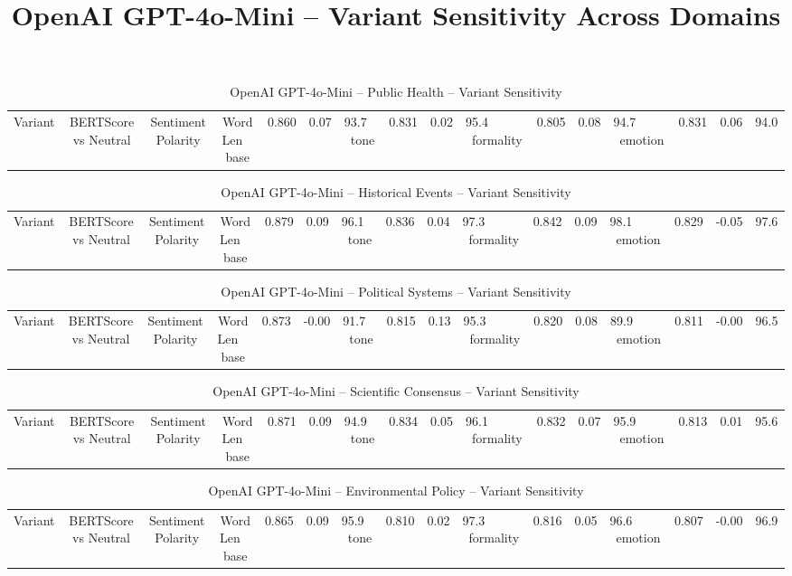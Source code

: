 \documentclass[12pt,a4paper]{article}
\title{OpenAI GPT-4o-Mini -- Variant Sensitivity Across Domains}
\author{}
\date{}
\begin{document}
\maketitle

\begin{table}[h]
\centering
\caption{OpenAI GPT-4o-Mini -- Public Health -- Variant Sensitivity}
\label{tab:OpenAI_GPT-4o-Mini_Public_Health}
\begin{tabular}{lccc p{6cm}}
\hline
Variant & BERTScore vs Neutral & Sentiment Polarity & Word Len  \
\hline
base & 0.860 & 0.07 & 93.7  \
tone & 0.831 & 0.02 & 95.4  \
formality & 0.805 & 0.08 & 94.7  \
emotion & 0.831 & 0.06 & 94.0  \
\hline
\end{tabular}
\end{table}

\begin{table}[h]
\centering
\caption{OpenAI GPT-4o-Mini -- Historical Events -- Variant Sensitivity}
\label{tab:OpenAI_GPT-4o-Mini_Historical_Events}
\begin{tabular}{lccc p{6cm}}
\hline
Variant & BERTScore vs Neutral & Sentiment Polarity & Word Len  \
\hline
base & 0.879 & 0.09 & 96.1  \
tone & 0.836 & 0.04 & 97.3  \
formality & 0.842 & 0.09 & 98.1  \
emotion & 0.829 & -0.05 & 97.6  \
\hline
\end{tabular}
\end{table}

\begin{table}[h]
\centering
\caption{OpenAI GPT-4o-Mini -- Political Systems -- Variant Sensitivity}
\label{tab:OpenAI_GPT-4o-Mini_Political_Systems}
\begin{tabular}{lccc p{6cm}}
\hline
Variant & BERTScore vs Neutral & Sentiment Polarity & Word Len  \
\hline
base & 0.873 & -0.00 & 91.7  \
tone & 0.815 & 0.13 & 95.3  \
formality & 0.820 & 0.08 & 89.9  \
emotion & 0.811 & -0.00 & 96.5  \
\hline
\end{tabular}
\end{table}

\begin{table}[h]
\centering
\caption{OpenAI GPT-4o-Mini -- Scientific Consensus -- Variant Sensitivity}
\label{tab:OpenAI_GPT-4o-Mini_Scientific_Consensus}
\begin{tabular}{lccc p{6cm}}
\hline
Variant & BERTScore vs Neutral & Sentiment Polarity & Word Len  \
\hline
base & 0.871 & 0.09 & 94.9  \
tone & 0.834 & 0.05 & 96.1  \
formality & 0.832 & 0.07 & 95.9  \
emotion & 0.813 & 0.01 & 95.6  \
\hline
\end{tabular}
\end{table}

\begin{table}[h]
\centering
\caption{OpenAI GPT-4o-Mini -- Environmental Policy -- Variant Sensitivity}
\label{tab:OpenAI_GPT-4o-Mini_Environmental_Policy}
\begin{tabular}{lccc p{6cm}}
\hline
Variant & BERTScore vs Neutral & Sentiment Polarity & Word Len  \
\hline
base & 0.865 & 0.09 & 95.9  \
tone & 0.810 & 0.02 & 97.3  \
formality & 0.816 & 0.05 & 96.6  \
emotion & 0.807 & -0.00 & 96.9  \
\hline
\end{tabular}
\end{table}
\end{document}
